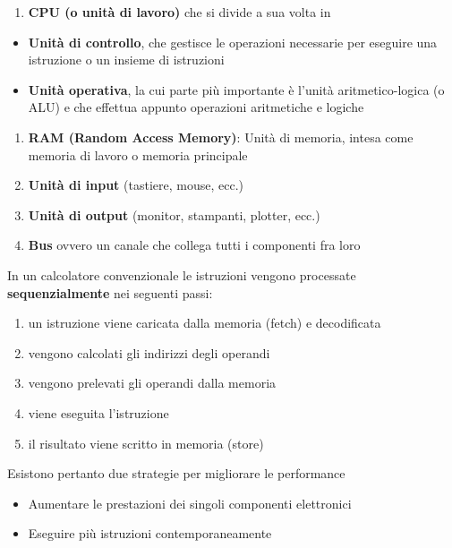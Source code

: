 \documentclass[italian,]{article}
\providecommand{\tightlist}{%
  \setlength{\itemsep}{0pt}\setlength{\parskip}{0pt}}
\begin{document}
\begin{enumerate}
\def\labelenumi{\arabic{enumi}.}
\tightlist
\item
  \textbf{CPU (o unità di lavoro)} che si divide a sua volta in
\end{enumerate}

\begin{itemize}
\tightlist
\item
  \textbf{Unità di controllo}, che gestisce le operazioni necessarie per
  eseguire una istruzione o un insieme di istruzioni
\item
  \textbf{Unità operativa}, la cui parte più importante è l'unità
  aritmetico-logica (o ALU) e che effettua appunto operazioni
  aritmetiche e logiche
\end{itemize}

\begin{enumerate}
\def\labelenumi{\arabic{enumi}.}
\setcounter{enumi}{1}
\tightlist
\item
  \textbf{RAM (Random Access Memory)}: Unità di memoria, intesa come
  memoria di lavoro o memoria principale
\item
  \textbf{Unità di input} (tastiere, mouse, ecc.)
\item
  \textbf{Unità di output} (monitor, stampanti, plotter, ecc.)
\item
  \textbf{Bus} ovvero un canale che collega tutti i componenti fra loro
\end{enumerate}

In un calcolatore convenzionale le istruzioni vengono processate
\textbf{sequenzialmente} nei seguenti passi:

\begin{enumerate}
\def\labelenumi{\arabic{enumi}.}
\tightlist
\item
  un istruzione viene caricata dalla memoria (fetch) e decodificata
\item
  vengono calcolati gli indirizzi degli operandi
\item
  vengono prelevati gli operandi dalla memoria
\item
  viene eseguita l'istruzione
\item
  il risultato viene scritto in memoria (store)
\end{enumerate}

Esistono pertanto due strategie per migliorare le performance

\begin{itemize}
\tightlist
\item
  Aumentare le prestazioni dei singoli componenti elettronici
\item
  Eseguire più istruzioni contemporaneamente
\end{itemize}
\end{document}
